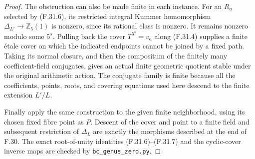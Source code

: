 \begin{proof}
The obstruction can also be made finite in each
instance. For an $R_a$ selected by (F.31.6), its
restricted integral Kummer homomorphism
$\Delta_{L'}\to\mathbb Z_5(1)$ is nonzero, since its
rational class is nonzero. It remains nonzero modulo
some $5^s$. Pulling back the cover
$T^{5^s}=v_a$ along (F.31.4) supplies a finite
\'etale cover on which the indicated endpoints
cannot be joined by a fixed path.
Taking its normal closure, and then the compositum
of the finitely many coefficient-field conjugates,
gives an actual finite geometric quotient stable
under the original arithmetic action.  The conjugate
family is finite because all the coefficients,
points, roots, and covering equations used here
descend to the finite extension $L'/L$.

Finally apply the same construction to the given
finite neighborhood, using its chosen fixed fibre
point as $P$. Descent of the cover and point to a
finite field and subsequent restriction of
$\Delta_L$ are exactly the morphisms described at
the end of F.30.
The exact root-of-unity identities (F.31.6)--(F.31.7)
and the cyclic-cover inverse maps are checked by
\texttt{bc\_genus\_zero.py}.
\end{proof}


